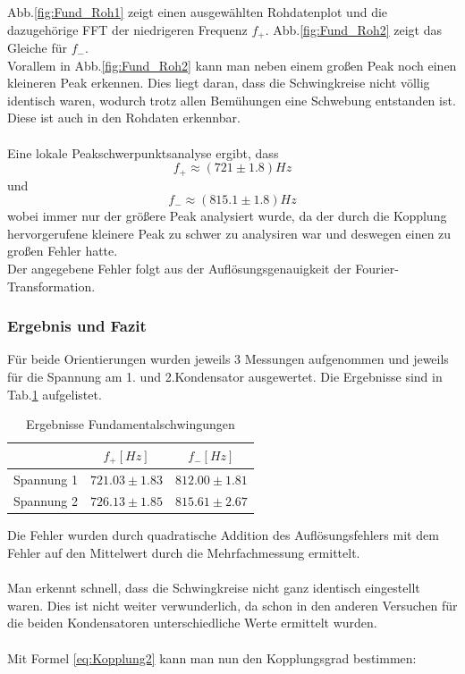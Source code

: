 \documentclass[12pt,a4paper]{article}
\begin{document}
Abb.\ref{fig:Fund_Roh1} zeigt einen ausgewählten Rohdatenplot und die dazugehörige FFT der niedrigeren Frequenz $f_+$. Abb.\ref{fig:Fund_Roh2} zeigt das Gleiche für $f_-$.\\
Vorallem in Abb.\ref{fig:Fund_Roh2} kann man neben einem großen Peak noch einen kleineren Peak erkennen. Dies liegt daran, dass die Schwingkreise nicht völlig identisch waren, wodurch trotz allen Bemühungen eine Schwebung entstanden ist.
Diese ist auch in den Rohdaten erkennbar.\\
\\
Eine lokale Peakschwerpunktsanalyse ergibt, dass
\begin{equation}
f_+ \approx (721\pm 1.8)Hz
\end{equation}
und
\begin{equation}
f_- \approx (815.1\pm 1.8)Hz
\end{equation}
wobei immer nur der größere Peak analysiert wurde, da der durch die Kopplung hervorgerufene kleinere Peak zu schwer zu analysiren war und deswegen einen zu großen Fehler hatte.\\
Der angegebene Fehler folgt aus der Auflösungsgenauigkeit der Fourier-Transformation.

\subsubsection{Ergebnis und Fazit}
Für beide Orientierungen wurden jeweils 3 Messungen aufgenommen und jeweils für die Spannung am 1. und 2.Kondensator ausgewertet. Die Ergebnisse sind in Tab.\ref{tab:Fund_Ergebnis} aufgelistet.

\begin{table}[H]
\begin{center}
\begin{tabular}{|c|c|c|}
\hline 
 & $f_+[Hz]$ & $f_-[Hz]$ \\ 
\hline 
Spannung 1 & $721.03\pm1.83$ & $812.00\pm1.81$ \\ 
\hline 
Spannung 2 & $726.13\pm1.85$ & $815.61\pm2.67$ \\ 
\hline 
\end{tabular} 
\end{center}
\label{tab:Fund_Ergebnis}
\caption{Ergebnisse Fundamentalschwingungen}
\end{table}

Die Fehler wurden durch quadratische Addition des Auflösungsfehlers mit dem Fehler auf den Mittelwert durch die Mehrfachmessung ermittelt. \\
\\
Man erkennt schnell, dass die Schwingkreise nicht ganz identisch eingestellt waren. Dies ist nicht weiter verwunderlich, da schon in den anderen Versuchen für die beiden Kondensatoren unterschiedliche Werte ermittelt wurden.\\
\\
Mit Formel \ref{eq:Kopplung2} kann man nun den Kopplungsgrad bestimmen:
\end{document}
